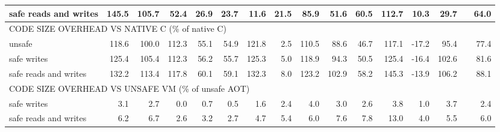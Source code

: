 \begin{landscape}
\begin{table}[t!]
\begin{tabular}{lrrrrrrrrrrrrrrr}
    safe reads and writes               &      145.5 &      105.7 &       52.4 &       26.9 &       23.7 &       11.6 &       21.5 &       85.9 &       51.6 &       60.5 &      112.7 &       10.3 &       29.7 &                   &      64.0 \\
    \midrule
    \multicolumn{10}{l}{CODE SIZE OVERHEAD VS NATIVE C (\% of native C)} \\
    unsafe                              &      118.6 &      100.0 &      112.3 &       55.1 &       54.9 &      121.8 &        2.5 &      110.5 &       88.6 &       46.7 &      117.1 &      -17.2 &       95.4 &                   &      77.4 \\
    safe writes                         &      125.4 &      105.4 &      112.3 &       56.2 &       55.7 &      125.3 &        5.0 &      118.9 &       94.3 &       50.5 &      125.4 &      -16.4 &      102.6 &                   &      81.6 \\
    safe reads and writes               &      132.2 &      113.4 &      117.8 &       60.1 &       59.1 &      132.3 &        8.0 &      123.2 &      102.9 &       58.2 &      145.3 &      -13.9 &      106.2 &                   &      88.1 \\
    \multicolumn{10}{l}{CODE SIZE OVERHEAD VS UNSAFE VM (\% of unsafe AOT)} \\
    safe writes                         &        3.1 &        2.7 &        0.0 &        0.7 &        0.5 &        1.6 &        2.4 &        4.0 &        3.0 &        2.6 &        3.8 &        1.0 &        3.7 &                   &       2.4 \\
    safe reads and writes               &        6.2 &        6.7 &        2.6 &        3.2 &        2.7 &        4.7 &        5.4 &        6.0 &        7.6 &        7.8 &       13.0 &        4.0 &        5.5 &                   &       6.0 \\
    \bottomrule
    \end{tabular}
\end{table}
\end{landscape}
\clearpage
\restoregeometry
